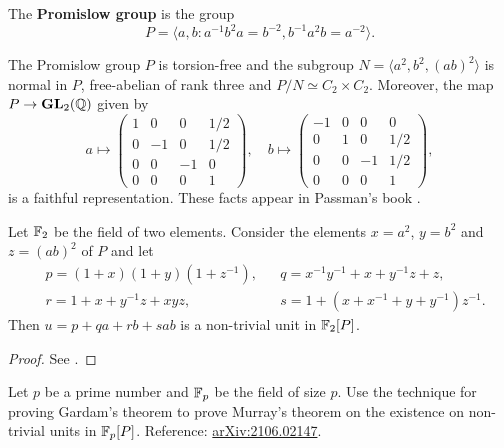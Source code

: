 \begin{definition}
    The \textbf{Promislow group} is the group
    \[
    P=\langle a,b:a^{-1}b^2a=b^{-2},b^{-1}a^2b=a^{-2}\rangle.
    \]
\end{definition}

The Promislow group $P$ is torsion-free 
and the subgroup 
$N=\langle a^2,b^2,(ab)^2\rangle$ is normal in $P$, 
free-abelian of rank three and $P/N\simeq C_2\times C_2$.
Moreover, the map $P\to\mathbf{GL}_2(\mathbb{Q})$ given by  
\[
a\mapsto\begin{pmatrix}
1 & 0 & 0 & 1/2\\
0 & -1 & 0 & 1/2\\
0 & 0 & -1 & 0\\
0 & 0 & 0 & 1
\end{pmatrix},
\quad
b\mapsto\begin{pmatrix}
-1 & 0 & 0 & 0\\
0 & 1 & 0 & 1/2\\
0 & 0 & -1 & 1/2\\
0 & 0 & 0 & 1
\end{pmatrix}, 
\]
is a faithful representation. These facts appear in Passman's book \cite{MR798076}. 

\begin{theorem}[Gardam]
\label{thm:Gardam_char2}
    Let $\mathbb{F}_2$ be the field of two elements. Consider the elements 
    $x=a^2$, $y=b^2$ and $z=(ab)^2$ of $P$ and let 
    \begin{align*}
        &p=(1+x)(1+y)(1+z^{-1}), 
        &&q = x^{-1}y^{-1}+x+y^{-1}z+z,\\
        &r = 1+x+y^{-1}z+xyz,
        &&s=1+(x+x^{-1}+y+y^{-1})z^{-1}.
    \end{align*}
    Then $u=p+qa+rb+sab$ is a non-trivial unit in $\mathbb{F}_2[P]$. 
\end{theorem}

\begin{proof}
    See \cite{MR4334981}. 
\end{proof}

\begin{exercise}
     Let $p$ be a prime number and $\mathbb{F}_p$ be the field of size $p$. 
     Use the technique 
     for proving Gardam's theorem to prove Murray's theorem
     on the existence 
     on non-trivial units in $\mathbb{F}_p[P]$. 
     Reference: \href{https://arxiv.org/abs/2106.02147}{arXiv:2106.02147}. 
\end{exercise}

